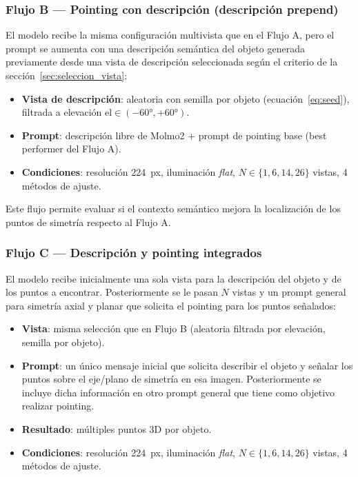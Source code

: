 \subsubsection{Flujo B — Pointing con descripción (descripción prepend)}

El modelo recibe la misma configuración multivista que en el Flujo A, pero el
prompt se aumenta con una descripción semántica del objeto generada previamente
desde una vista de descripción seleccionada según el criterio de la
sección~\ref{sec:seleccion_vista}:

\begin{itemize}
    \item \textbf{Vista de descripción}: aleatoria con semilla por objeto
          (ecuación~\eqref{eq:seed}), filtrada a elevación
          $\text{el} \in (-60°, +60°)$.
    \item \textbf{Prompt}: descripción libre de Molmo2 + prompt de pointing base
          (best performer del Flujo A).
    \item \textbf{Condiciones}: resolución 224~px, iluminación \textit{flat},
          $N \in \{1, 6, 14, 26\}$ vistas, 4 métodos de ajuste.
\end{itemize}

Este flujo permite evaluar si el contexto semántico mejora la localización de
los puntos de simetría respecto al Flujo A.

\subsubsection{Flujo C — Descripción y pointing integrados}

El modelo recibe inicialmente una sola vista para la descripción del objeto y
de los puntos a encontrar. Posteriormente se le pasan $N$ vistas y un prompt
general para simetría axial y planar que solicita el pointing para los puntos
señalados:

\begin{itemize}
    \item \textbf{Vista}: misma selección que en Flujo B (aleatoria filtrada por
          elevación, semilla por objeto).
    \item \textbf{Prompt}: un único mensaje inicial que solicita describir el
          objeto y señalar los puntos sobre el eje/plano de simetría en esa
          imagen. Posteriormente se incluye dicha información en otro prompt
          general que tiene como objetivo realizar pointing.
    \item \textbf{Resultado}: múltiples puntos 3D por objeto.
    \item \textbf{Condiciones}: resolución 224~px, iluminación \textit{flat},
          $N \in \{1, 6, 14, 26\}$ vistas, 4 métodos de ajuste.
\end{itemize}

